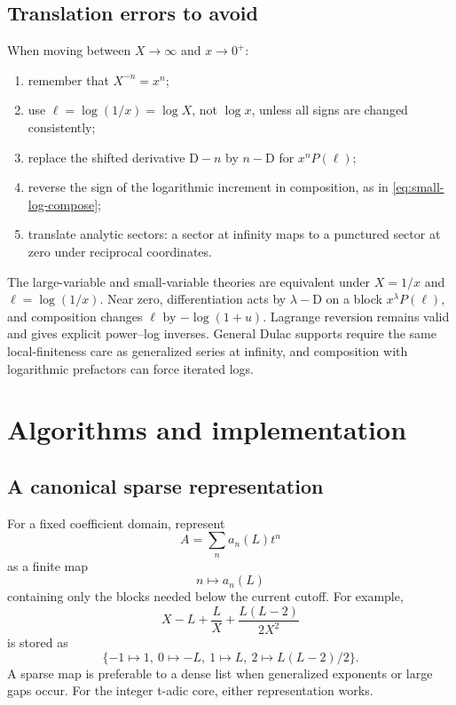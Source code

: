 \documentclass[11pt,openany]{book}
\theoremstyle{definition}
\theoremstyle{plain}
\theoremstyle{remark}
\newcommand{\Dop}{\mathrm{D}}
\begin{document}
\section{Translation errors to avoid}
When moving between \(X\to\infty\) and \(x\to0^+\):
\begin{enumerate}
\item remember that \(X^{-n}=x^n\);
\item use \(\ell=\log(1/x)=\log X\), not \(\log x\), unless all signs are
      changed consistently;
\item replace the shifted derivative \(\Dop-n\) by \(n-\Dop\) for
      \(x^nP(\ell)\);
\item reverse the sign of the logarithmic increment in composition, as in
      \cref{eq:small-log-compose};
\item translate analytic sectors: a sector at infinity maps to a punctured
      sector at zero under reciprocal coordinates.
\end{enumerate}

\begin{summarybox}
The large-variable and small-variable theories are equivalent under
\(X=1/x\) and \(\ell=\log(1/x)\).  Near zero, differentiation acts by
\(\lambda-\Dop\) on a block \(x^\lambda P(\ell)\), and composition changes
\(\ell\) by \(-\log(1+u)\).  Lagrange reversion remains valid and gives explicit
power--log inverses.  General Dulac supports require the same local-finiteness
care as generalized series at infinity, and composition with logarithmic
prefactors can force iterated logs.
\end{summarybox}

\chapter{Algorithms and implementation}\label{ch:implementation}

\section{A canonical sparse representation}
For a fixed coefficient domain, represent
\[
 A=\sum_na_n(L)t^n
\]
as a finite map
\[
 n\longmapsto a_n(L)
\]
containing only the blocks needed below the current cutoff.  For example,
\[
 X-L+\frac{L}{X}+\frac{L(L-2)}{2X^2}
\]
is stored as
\[
 \{-1\mapsto1,\ 0\mapsto-L,\ 1\mapsto L,\
 2\mapsto L(L-2)/2\}.
\]
A sparse map is preferable to a dense list when generalized exponents or large
gaps occur.  For the integer t-adic core, either representation works.
\end{document}
